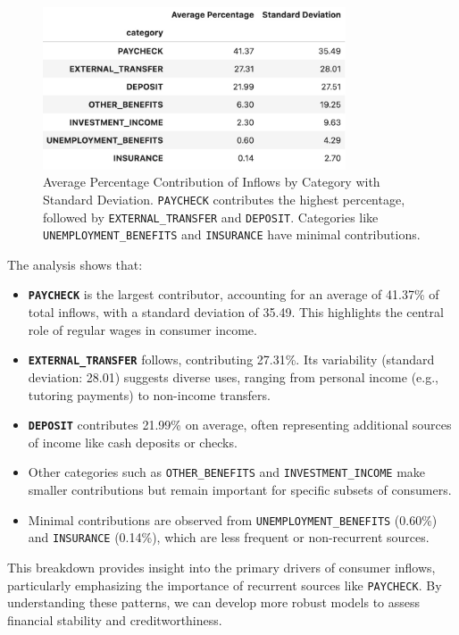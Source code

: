 \documentclass[12pt,letterpaper]{article}
\begin{document}
\begin{figure}[H]
    \centering
    \includegraphics[width=0.8\textwidth]{figure/inflows.jpeg}
    \caption{Average Percentage Contribution of Inflows by Category with Standard Deviation. \texttt{PAYCHECK} contributes the highest percentage, followed by \texttt{EXTERNAL\_TRANSFER} and \texttt{DEPOSIT}. Categories like \texttt{UNEMPLOYMENT\_BENEFITS} and \texttt{INSURANCE} have minimal contributions.}
    \label{fig:inflow_contributions}
\end{figure}

The analysis shows that:
\begin{itemize}
    \item \textbf{\texttt{PAYCHECK}} is the largest contributor, accounting for an average of 41.37\% of total inflows, with a standard deviation of 35.49. This highlights the central role of regular wages in consumer income.
    \item \textbf{\texttt{EXTERNAL\_TRANSFER}} follows, contributing 27.31\%. Its variability (standard deviation: 28.01) suggests diverse uses, ranging from personal income (e.g., tutoring payments) to non-income transfers.
    \item \textbf{\texttt{DEPOSIT}} contributes 21.99\% on average, often representing additional sources of income like cash deposits or checks.
    \item Other categories such as \texttt{OTHER\_BENEFITS} and \texttt{INVESTMENT\_INCOME} make smaller contributions but remain important for specific subsets of consumers.
    \item Minimal contributions are observed from \texttt{UNEMPLOYMENT\_BENEFITS} (0.60\%) and \texttt{INSURANCE} (0.14\%), which are less frequent or non-recurrent sources.
\end{itemize}

This breakdown provides insight into the primary drivers of consumer inflows, particularly emphasizing the importance of recurrent sources like \texttt{PAYCHECK}. By understanding these patterns, we can develop more robust models to assess financial stability and creditworthiness.
\end{document}
